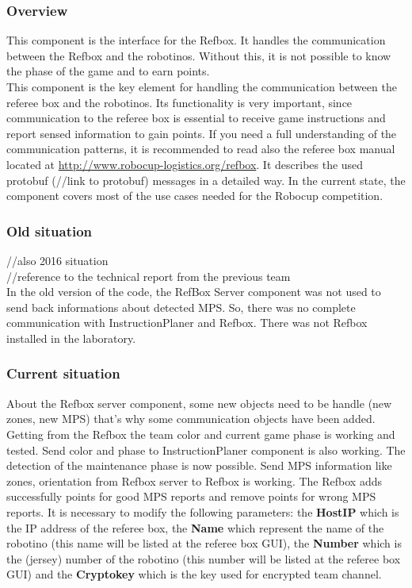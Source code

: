 
\subsubsection{Overview}

This component is the interface for the Refbox. It handles the communication between the Refbox and the robotinos. Without this, it is not possible to know the phase of the game and to earn points. \\

This component is the key element for handling the communication between the referee box and the robotinos. Its functionality is very important, since communication to the referee box is essential to receive game instructions and report sensed information to gain points. If you need a full understanding of the communication patterns, it is recommended to read also the referee box manual located at \url{ http://www.robocup-logistics.org/refbox}. It describes the used protobuf (//link to protobuf) messages in a detailed way. In the current state, the component covers most of the use cases needed for the Robocup competition.
 

\subsubsection{Old situation}

//also 2016 situation \\
//reference to the technical report from the previous team \\

In the old version of the code, the RefBox Server component was not used to send back informations about detected MPS. So, there was no complete communication with InstructionPlaner and Refbox. There was not Refbox installed in the laboratory. 


\subsubsection{Current situation}

About the Refbox server component, some new objects need to be handle (new zones, new MPS) that’s why some communication objects have been added. Getting from the Refbox the team color and current game phase is working and tested. Send color and phase to InstructionPlaner component is also working. The detection of the maintenance phase is now possible. Send MPS information like zones, orientation from Refbox server to Refbox is working. The Refbox adds successfully points for good MPS reports and remove points for wrong MPS reports. It is necessary to modify the following parameters: the \textbf{HostIP} which is the IP address of the referee box, the \textbf{Name} which represent the name of the robotino (this name will be listed at the referee box GUI), the \textbf{Number} which is the (jersey) number of the robotino (this number will be listed at the referee box GUI) and the \textbf{Cryptokey} which is the key used for encrypted team channel.\\


